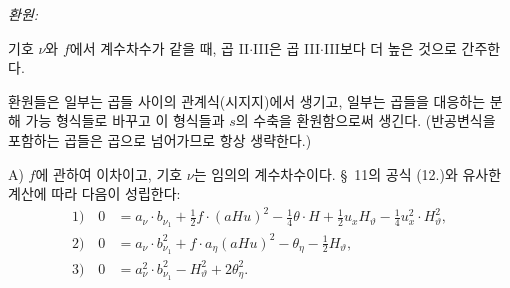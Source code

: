 
\noindent\emph{환원:}

기호 $\nu$와 $f$에서 계수차수가 같을 때, 곱 II$\cdot$III은 곱 III$\cdot$III보다 더 높은 것으로 간주한다.

환원들은 일부는 곱들 사이의 관계식(시지지)에서 생기고, 일부는 곱들을 대응하는 분해 가능 형식들로 바꾸고 이 형식들과 $s$의 수축을 환원함으로써 생긴다. (반공변식을 포함하는 곱들은 곱으로 넘어가므로 항상 생략한다.)

A) $f$에 관하여 이차이고, 기호 $\nu$는 임의의 계수차수이다. \S\ 11의 공식 (12.)와 유사한 계산에 따라 다음이 성립한다:
\begin{align*}
1)\quad 0&=a_\nu\cdot b_{\nu_1}+\frac12f\cdot(aHu)^2-\frac14\theta\cdot H+\frac12u_xH_\vartheta-\frac14u_x^2\cdot H_\vartheta^2,\\
2)\quad 0&=a_\nu\cdot b_{\nu_1}^2+f\cdot a_\eta(aHu)^2-\theta_\eta-\frac12H_\vartheta,\\
3)\quad 0&=a_\nu^2\cdot b_{\nu_1}^2-H_\vartheta^2+2\theta_\eta^2.
\end{align*}
